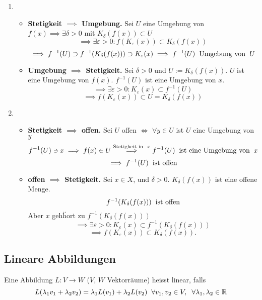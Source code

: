 \begin{Bew}
  \begin{enumerate}
    \item
      \begin{itemize}
        \item {\bf Stetigkeit $\implies$ Umgebung.}
          Sei $U$ eine Umgebung von $f(x)\implies \exists \delta>0$ mit $K_\delta(f(x))\subset U$
          \[\implies \exists \varepsilon>0:f(K_\varepsilon(x))\subset K_\delta(f(x))\]
          \[\implies f^{-1}(U)\supset f^{-1}(K_\delta(f(x)))\supset K_\varepsilon(x)\implies f^{-1}(U)\hspace{2mm}\text{Umgebung von}\hspace{2mm} U\]
        \item {\bf Umgebung $\implies$ Stetigkeit.} Sei $\delta>0$ und $U:=K_\delta(f(x))$. $U$ ist eine
Umgebung von $f(x)$. $f^{-1}(U)$ ist eine Umgebung von $x$.
          \[\implies \exists\varepsilon>0:K_\varepsilon(x)\subset f^{-1}(U)\]
          \[\implies f(K_\varepsilon(x))\subset U=K_\delta(f(x))\]
      \end{itemize}
    \item
      \begin{itemize}
        \item {\bf Stetigkeit $\implies$ offen.} Sei $U$ offen $\iff$ $\forall y\in U$ ist $U$ eine Umgebung von $y$
          \[f^{-1} (U)\ni x\implies f(x)\in U\stackrel{\text{Stetigkeit in}\hspace{2mm} x}{\implies} f^{-1}(U)\hspace{2mm}\text{ist eine Umgebung von}\hspace{2mm} x\]
          \[\implies f^{-1}(U)\hspace{2mm}\text{ist offen}\]
        \item {\bf offen $\implies$ Stetigkeit.} Sei $x\in X$, und $\delta>0$. $K_\delta(f(x))$ ist eine offene
Menge.
          \[f^{-1}(K_\delta(f(x)))\hspace{2mm}\text{ist offen}\]
Aber $x$ geh\"hort zu $f^{-1} (K_\delta (f(x)))$
          \[\implies \exists \varepsilon>0: K_\varepsilon(x)\subset f^{-1}(K_\delta(f(x)))\]
          \[\implies f(K_\varepsilon(x))\subset K_\delta(f(x)).\]
      \end{itemize}
  \end{enumerate}
\end{Bew}
\subsection{Lineare Abbildungen}
\begin{Def}
  Eine Abbildung $L:V\to W$ ($V$, $W$ Vektorr\"aume) heisst linear, falls
  \[L(\lambda_1v_1+\lambda_2v_2)=\lambda_1L(v_1)+\lambda_2L(v_2)\hspace{2mm}\forall v_1,v_2\in V,\hspace{2mm}\forall \lambda_1,\lambda_2\in\mathbb{R}\]
\end{Def}

